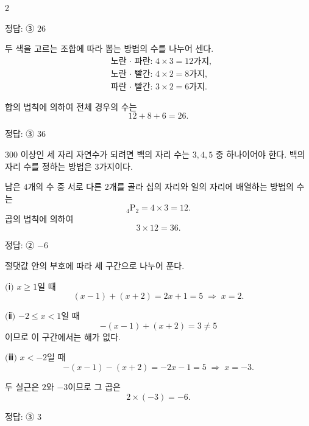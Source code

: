 \documentclass[10pt]{article}
\begin{document}
\raggedcolumns
\begin{multicols}{2}

\begin{answerbox}정답: ③ $26$\end{answerbox}

두 색을 고르는 조합에 따라 뽑는 방법의 수를 나누어 센다.
\begin{align*}
&\text{노란 · 파란: } 4 \times 3 = 12\text{가지}, \\
&\text{노란 · 빨간: } 4 \times 2 = 8\text{가지}, \\
&\text{파란 · 빨간: } 3 \times 2 = 6\text{가지}.
\end{align*}

합의 법칙에 의하여 전체 경우의 수는
\[ 12 + 8 + 6 = 26. \]

\begin{answerbox}정답: ③ $36$\end{answerbox}

$300$ 이상인 세 자리 자연수가 되려면 백의 자리 수는 $3, 4, 5$ 중 하나이어야 한다. 백의 자리 수를 정하는 방법은 $3$가지이다.

남은 $4$개의 수 중 서로 다른 $2$개를 골라 십의 자리와 일의 자리에 배열하는 방법의 수는
\[ {}_4\mathrm{P}_2 = 4 \times 3 = 12. \]
곱의 법칙에 의하여
\[ 3 \times 12 = 36. \]

\begin{answerbox}정답: ② $-6$\end{answerbox}

절댓값 안의 부호에 따라 세 구간으로 나누어 푼다.

$(\!$ⅰ$)$ $x \ge 1$일 때
\[ (x - 1) + (x + 2) = 2x + 1 = 5 \;\Rightarrow\; x = 2. \]

$(\!$ⅱ$)$ $-2 \le x < 1$일 때
\[ -(x - 1) + (x + 2) = 3 \ne 5 \]
이므로 이 구간에서는 해가 없다.

$(\!$ⅲ$)$ $x < -2$일 때
\[ -(x - 1) - (x + 2) = -2x - 1 = 5 \;\Rightarrow\; x = -3. \]

두 실근은 $2$와 $-3$이므로 그 곱은
\[ 2 \times (-3) = -6. \]

\begin{answerbox}정답: ③ $3$\end{answerbox}


\end{multicols}
\end{document}
